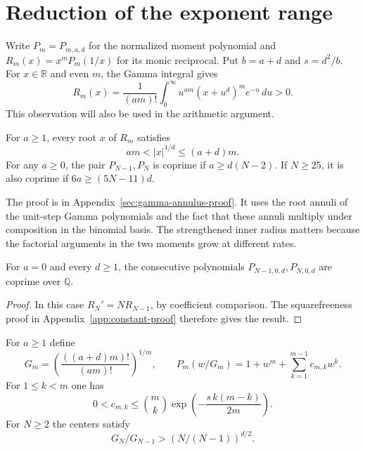 \section{Reduction of the exponent range}
\label{sec:supports}

Write \(P_m=P_{m,a,d}\) for the normalized moment polynomial and
\(R_m(x)=x^mP_m(1/x)\) for its monic reciprocal. Put \(b=a+d\) and
\(s=d^2/b\). For \(x\in\mathbb R\) and even \(m\), the Gamma integral gives
\[
 R_m(x)=\frac{1}{(am)!}
       \int_0^\infty u^{am}(x+u^d)^m e^{-u}\,du>0 .
\]
This observation will also be used in the arithmetic argument.

\begin{lemma}
\label{lem:gamma-annulus}
For \(a\ge1\), every root \(x\) of \(R_m\) satisfies
\[
 am<|x|^{1/d}\le (a+d)m .
\]
For any \(a\ge0\), the pair \(P_{N-1},P_N\) is coprime if
\(a\ge d(N-2)\). If \(N\ge25\), it is also coprime if
\(6a\ge (5N-11)d\).
\end{lemma}

The proof is in Appendix~\ref{sec:gamma-annulus-proof}. It uses the
root annuli of the unit-step Gamma polynomials and the fact that
these annuli multiply under composition in the binomial basis.
The strengthened inner radius matters because the factorial arguments
in the two moments grow at different rates.

\begin{lemma}
\label{lem:constant-support}
For \(a=0\) and every \(d\ge1\), the consecutive polynomials
\(P_{N-1,0,d},P_{N,0,d}\) are coprime over \(\mathbb Q\).
\end{lemma}

\begin{proof}
In this case \(R_N'=NR_{N-1}\), by coefficient comparison. The
squarefreeness proof in Appendix~\ref{app:constant-proof} therefore
gives the result.
\end{proof}

\begin{lemma}
\label{lem:center-ratio}
For \(a\ge1\) define
\[
 G_m=\left(\frac{((a+d)m)!}{(am)!}\right)^{1/m},
 \qquad
 P_m(w/G_m)=1+w^m+\sum_{k=1}^{m-1}c_{m,k}w^k .
\]
For \(1\le k<m\) one has
\begin{equation}\label{eq:normalized-coefficients}
 0<c_{m,k}\le
 \binom{m}{k}\exp\!\left(-\frac{s\,k(m-k)}{2m}\right).
\end{equation}
For \(N\ge2\) the centers satisfy
\[
 G_N/G_{N-1}>(N/(N-1))^{d/2}.
\]
\end{lemma}


